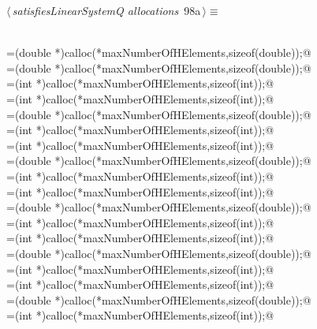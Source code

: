 \documentclass{article}
\begin{document}
\begin{flushleft} \small
\begin{minipage}{\linewidth}\label{scrap181}\raggedright\small
{} $\langle\,${\itshape satisfiesLinearSystemQ allocations}\nobreak\ {\footnotesize {98a}}$\,\rangle\equiv$
\vspace{-1ex}
\begin{list}{}{} \item
\mbox{}\verb@@\\
\mbox{}\verb@wkspc=(double *)calloc(*maxNumberOfHElements,sizeof(double));@\\
\mbox{}\verb@forHMult=(double *)calloc(*maxNumberOfHElements,sizeof(double));@\\
\mbox{}\verb@forHMultj=(int *)calloc(*maxNumberOfHElements,sizeof(int));@\\
\mbox{}\verb@forHMulti=(int *)calloc(*maxNumberOfHElements,sizeof(int));@\\
\mbox{}\verb@bTrans=(double *)calloc(*maxNumberOfHElements,sizeof(double));@\\
\mbox{}\verb@bTransj=(int *)calloc(*maxNumberOfHElements,sizeof(int));@\\
\mbox{}\verb@bTransi=(int *)calloc(*maxNumberOfHElements,sizeof(int));@\\
\mbox{}\verb@forBMult=(double *)calloc(*maxNumberOfHElements,sizeof(double));@\\
\mbox{}\verb@forBMultj=(int *)calloc(*maxNumberOfHElements,sizeof(int));@\\
\mbox{}\verb@forBMulti=(int *)calloc(*maxNumberOfHElements,sizeof(int));@\\
\mbox{}\verb@resBMult=(double *)calloc(*maxNumberOfHElements,sizeof(double));@\\
\mbox{}\verb@resBMultj=(int *)calloc(*maxNumberOfHElements,sizeof(int));@\\
\mbox{}\verb@resBMulti=(int *)calloc(*maxNumberOfHElements,sizeof(int));@\\
\mbox{}\verb@partB=(double *)calloc(*maxNumberOfHElements,sizeof(double));@\\
\mbox{}\verb@partBj=(int *)calloc(*maxNumberOfHElements,sizeof(int));@\\
\mbox{}\verb@partBi=(int *)calloc(*maxNumberOfHElements,sizeof(int));@\\
\mbox{}\verb@ltpt=(double *)calloc(*maxNumberOfHElements,sizeof(double));@\\
\mbox{}\verb@ltptj=(int *)calloc(*maxNumberOfHElements,sizeof(int));@\\

\end{list}
\end{minipage}
\end{flushleft}
\end{document}
